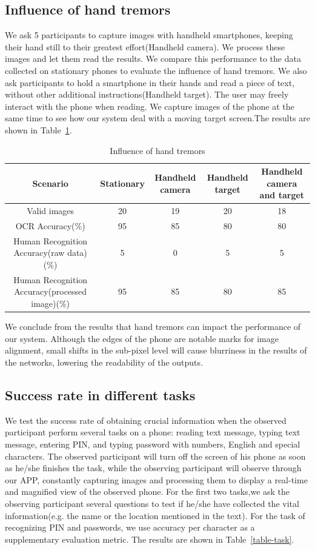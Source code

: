 \subsection{Influence of hand tremors}
We ask 5 participants to capture images with handheld smartphones, keeping their hand still to their greatest effort(Handheld camera). We process these images and let them read the results. We compare this performance to the data collected on stationary phones to evaluate the influence of hand tremors.
We also ask participants to hold a smartphone in their hands and read a piece of text, without other additional instructions(Handheld target). The user may freely interact with the phone when reading. We capture images of the phone at the same time to see how our system deal with a moving target screen.The results are shown in Table~\ref{table-tremor}.
\begin{table}  
\begin{tabular}{c|c|c|c|c} 
Scenario &Stationary & Handheld camera & Handheld target & Handheld camera and target\\ \hline
Valid images & 20 & 19 & 20 & 18\\ \hline
OCR Accuracy(\%) & 95 & 85 & 80 & 80\\ \hline
Human Recognition Accuracy(raw data)(\%) & 5 & 0 & 5 & 5\\ \hline
Human Recognition Accuracy(processed image)(\%) & 95 & 85 & 80 & 85
\end{tabular} 
\caption{Influence of hand tremors}
\label{table-tremor}
\end{table}

We conclude from the results that hand tremors can impact the performance of our system. Although the edges of the phone are notable marks for image alignment, small shifts in the sub-pixel level will cause blurriness in the results of the networks, lowering the readability of the outputs. 

\subsection{Success rate in different tasks}
We test the success rate of obtaining crucial information when the observed participant perform several tasks on a phone: reading text message, typing text message, entering PIN, and typing password with numbers, English and special characters. The observed participant will turn off the screen of his phone as soon as he/she finishes the task, while the observing participant will observe through our APP, constantly capturing images and processing them to display a real-time and magnified view of the observed phone. For the first two tasks,we ask the observing participant several questions to test if he/she have collected the vital information(e.g. the name or the location mentioned in the text). For the task of recognizing PIN and passwords, we use accuracy per character as a supplementary evaluation metric. The results are shown in Table~\ref{table-task}.


